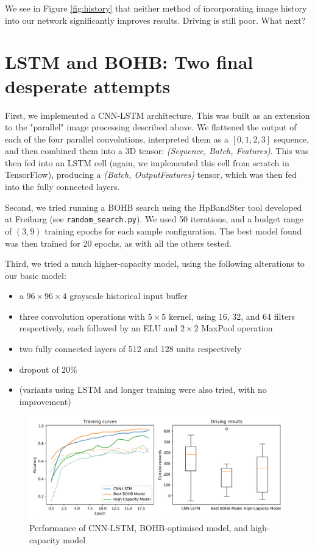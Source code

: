 \documentclass[11pt]{article} %
\begin{document}
We see in Figure \ref{fig:history} that neither method of incorporating image history into our network significantly improves results. Driving is still poor. What next?
 
\section{LSTM and BOHB: Two final desperate attempts}

First, we implemented a CNN-LSTM architecture. This was built as an extension to the "parallel" image processing described above. We flattened the output of each of the four parallel convolutions, interpreted them as a $[0,1,2,3]$ sequence, and then combined them into a 3D tensor: \textit{(Sequence, Batch, Features)}. This was then fed into an LSTM cell (again, we implemented this cell from scratch in TensorFlow), producing a \textit{(Batch, OutputFeatures)} tensor, which was then fed into the fully connected layers.

Second, we tried running a BOHB search using the HpBandSter tool developed at Freiburg (see \texttt{random\_search.py}). We used 50 iterations, and a budget range of $(3, 9)$ training epochs for each sample configuration. The best model found was then trained for 20 epochs, as with all the others tested.

Third, we tried a much higher-capacity model, using the following alterations to our basic model:

\begin{itemize}
	\item a $96 \times 96 \times 4$ grayscale historical input buffer 
	\item three convolution operations with $5 \times 5$ kernel, using 16, 32, and 64 filters respectively, each followed by an ELU and $2 \times 2$ MaxPool operation
	\item two fully connected layers of 512 and 128 units respectively
	\item dropout of 20\%
	\item (variants using LSTM and longer training were also tried, with no improvement)
\end{itemize}

\begin{figure}
	\includegraphics[width=\linewidth]{figs/final.png}
	\caption{Performance of CNN-LSTM, BOHB-optimised model, and high-capacity model}
	\label{fig:final}
\end{figure}
\end{document}
